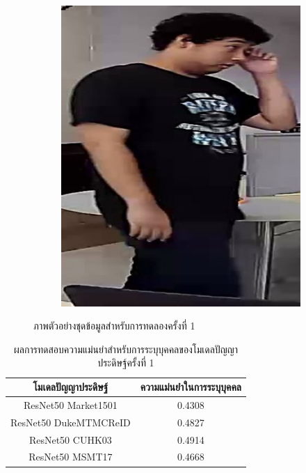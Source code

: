 \begin{figure}[!ht]
\begin{subfigure}[b]{0.2\textwidth}
        \includegraphics[width=\textwidth]{chapter4/images/o_1.jpg}
        \label{fig:ex_2}
    \end{subfigure}
    \caption{ภาพตัวอย่างชุดข้อมูลสำหรับการทดลองครั้งที่ 1}
    \label{fig: ภาพตัวอย่างชุดข้อมูลสำหรับการทดลอง 1}
\end{figure}
\begin{table}[!ht]
\centering
\begin{tabular}{|c|c|}
		\hline
		{โมเดลปัญญาประดิษฐ์}&{ความแม่นยำในการระบุบุคคล}							\\
		\hline
		ResNet50 Market1501	 			& 0.4308								\\
		ResNet50 DukeMTMCReID			& 0.4827								\\
		ResNet50 CUHK03				& 0.4914								\\
		ResNet50 MSMT17				& 0.4668								\\
	\hline
\end{tabular}
\caption{ผลการทดสอบความแม่นยำสำหรับการระบุบุคคลของโมเดลปัญญาประดิษฐ์ครั้งที่ 1}
\label{tab: Original distant of image 1}
\end{table}
